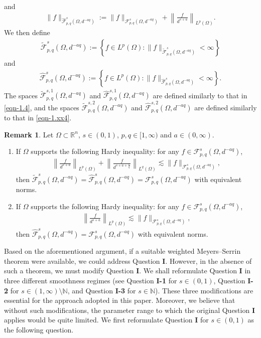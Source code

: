 \documentclass[11pt,twoside]{article}
\def\boz{{\Omega}}
\theoremstyle{mylem}
\theoremstyle{definition}
\newtheorem{remark}[theorem]{Remark}
\numberwithin{equation}{section}
\begin{document}
and
\begin{align*}
\|f\|_{\widehat{\mathcal{F}}_{p,q}^s(\Omega,d^{-aq})}
:=\|f\|_{\mathcal F_{p,q}^s(\Omega,d^{-aq})}
+\left\|\frac{f}{d^{s+a}}\right\|_{L^p(\Omega)}.
\end{align*}
We then define
\begin{align*}
\widetilde{\mathcal{F}}_{p,q}^s(\Omega,d^{-aq})
:=\left\{f\in L^p(\boz):\|f\|_{\widetilde{\mathcal{F}}_{p,q}^s(\Omega,d^{-aq})}<\infty\right\}
\end{align*}
and
\begin{align*}
\widehat{\mathcal{F}}_{p,q}^s(\Omega,d^{-aq})
:=\left\{f\in L^p(\boz):\|f\|_{\widehat{\mathcal{F}}_{p,q}^s(\Omega,d^{-aq})}<\infty\right\}.
\end{align*}
The spaces $\widetilde{\mathcal{F}}_{p,q}^{s,1}(\boz,d^{-aq})$ and $\widehat{\mathcal{F}}_{p,q}^{s,1}(\boz,d^{-aq})$
are defined similarly to that in \eqref{eqn-1.4},
and the spaces
$\widetilde{\mathcal{F}}_{p,q}^{s,2}(\boz,d^{-aq})$ and $\widehat{\mathcal{F}}_{p,q}^{s,2}(\boz,d^{-aq})$ are defined similarly to that in \eqref{eqn-1.xx4}.

\begin{remark}\label{remark}
Let $\Omega\subset\mathbb{R}^n$, $s\in(0,1)$,
$p,q\in[1,\infty)$ and $a\in(0,\infty)$.
\begin{enumerate}
\item[\rm(i)] 
If $\Omega$ supports the following Hardy
inequality: for any $f\in\mathcal F_{p,q}^s(\Omega,d^{-aq})$,
\begin{align*}
\left\|\frac{f}{d^{s+a}}\right\|_{L^p(\Omega)}
+\left\|\frac{f}{d^{s+a+\frac{n}{q}}}\right\|_{L^q(\Omega)}
\lesssim\|f\|_{\mathcal F_{p,q}^s(\Omega,d^{-aq})},
\end{align*}
then $\widetilde{\mathcal{F}}_{p,q}^s(\Omega,d^{-aq})=\widehat{\mathcal F}_{p,q}^{s}(\Omega,d^{-aq})
=\mathcal{F}_{p,q}^s(\Omega,d^{-aq})$
with equivalent norms.
\item[\rm(ii)]
If $\Omega$ supports the following Hardy
inequality: for any $f\in\mathcal F_{p,q}^s(\Omega,d^{-aq})$,
\begin{align*}
\left\|\frac{f}{d^{s+a}}\right\|_{L^p(\Omega)}
\lesssim\|f\|_{\mathcal F_{p,q}^s(\Omega,d^{-aq})},
\end{align*}
then $\widehat{\mathcal{F}}_{p,q}^s(\Omega,d^{-aq})
=\mathcal{F}_{p,q}^s(\Omega,d^{-aq})$ with equivalent norms.
\end{enumerate}
\end{remark}

Based on the aforementioned argument, if a suitable weighted Meyers--Serrin theorem
were available, we could address Question {\bf I}. However, in the absence
of such a theorem, we must modify Question {\bf I}. 
We shall reformulate
Question {\bf I} in three different smoothness regimes (see
Question {\bf I-1} for \(s\in(0,1)\), Question {\bf I-2} for
\(s\in(1,\infty)\setminus\mathbb N\), and Question {\bf I-3} for
\(s\in\mathbb N\)). 
These three modifications are essential for the approach adopted in this
paper. Moreover, we believe that without such modifications, 
the parameter range to which the original Question {\bf I} applies would be
quite limited.
We first reformulate Question {\bf I} for \(s\in(0,1)\) as
the following question.
\end{document}
